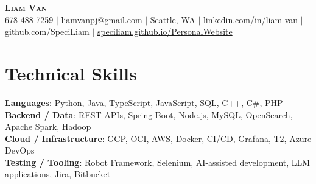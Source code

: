 \documentclass[letterpaper,11pt]{article}
\begin{document}

%
\begin{center}
    \textbf{\Huge \scshape Liam Van} \\ \vspace{1pt}
    \small 678-488-7259 $|$ \small {liamvanpj@gmail.com} $|$ Seattle, WA
 {{$|$ linkedin.com/in/liam-van} {$|$ github.com/SpeciLiam} {$|$ \href{https://speciliam.github.io/PersonalWebsite}{speciliam.github.io/PersonalWebsite}}}

\end{center}

\section{Technical Skills}
 \begin{itemize}[leftmargin=0.15in, label={}]
    \small{\item{
     \textbf{Languages}{: Python, Java, TypeScript, JavaScript, SQL, C++, C\#, PHP} \\
     \textbf{Backend / Data}{: REST APIs, Spring Boot, Node.js, MySQL, OpenSearch, Apache Spark, Hadoop} \\
     \textbf{Cloud / Infrastructure}{: GCP, OCI, AWS, Docker, CI/CD, Grafana, T2, Azure DevOps} \\
     \textbf{Testing / Tooling}{: Robot Framework, Selenium, AI-assisted development, LLM applications, Jira, Bitbucket} \\
    }}
 \end{itemize}
%
\end{document}
